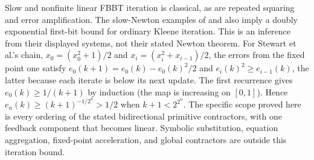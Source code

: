 Slow and nonfinite linear FBBT iteration is classical, as are repeated
squaring and error amplification. The slow-Newton examples of
\citet[Section 7, Theorem 7.1]{EsparzaEtAl2010} and
\citet[Section 4.1, equation (18)]{StewartEtAl2015} also imply a doubly
exponential first-bit bound for ordinary Kleene iteration. This is an
inference from their displayed systems, not their stated Newton theorem.
For Stewart et al.'s chain, $x_0=(x_0^2+1)/2$ and
$x_i=(x_i^2+x_{i-1})/2$, the errors from the fixed point one satisfy
$e_0(k+1)=e_0(k)-e_0(k)^2/2$ and $e_i(k)^2\ge e_{i-1}(k)$, the latter
because each iterate is below its next update. The first recurrence gives
$e_0(k)\ge1/(k+1)$ by induction (the map is increasing on $[0,1]$).
Hence $e_n(k)\ge(k+1)^{-1/2^n}>1/2$ when $k+1<2^{2^n}$. The
specific scope proved here is every ordering of the stated bidirectional
primitive contractors, with one feedback component that becomes linear.
Symbolic substitution, equation aggregation, fixed-point acceleration,
and global contractors are outside this iteration bound.
